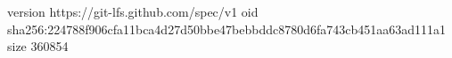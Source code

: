 version https://git-lfs.github.com/spec/v1
oid sha256:224788f906cfa11bca4d27d50bbe47bebbddc8780d6fa743cb451aa63ad111a1
size 360854
